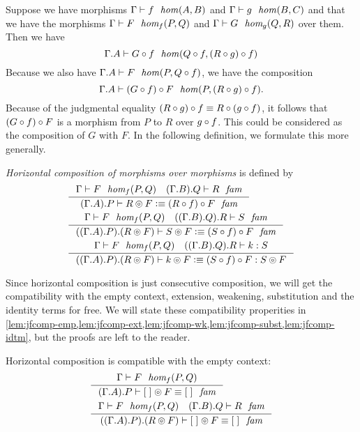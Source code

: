 Suppose we have morphisms $\jhom{\Gamma}{A}{B}{f}$ and $\jhom{\Gamma}{B}{C}{g}$
and that we have the morphisms $\jfhom{\Gamma}{A}{B}{f}{P}{Q}{F}$ and
$\jfhom{\Gamma}{B}{C}{g}{Q}{R}{G}$ over them. Then we have\begin{equation*}
\jhom
  {{\Gamma}{A}}
  {\jcomp{A}{f}{Q}}
  {\jcomp{A}{f}{{B}{g}{R}}}
  {\jcomp{A}{f}{G}}
\end{equation*}
Because we also have $\jhom{{\Gamma}{A}}{P}{\jcomp{A}{f}{Q}}{F}$, we have the
composition\begin{equation*}
\jhom
  {{\Gamma}{A}}
  {P}
  {\jcomp{A}{f}{{B}{g}{R}}}
  {\jcomp{P}{F}{\jcomp{A}{f}{G}}}.
\end{equation*}
Because of 
the judgmental equality $\jcomp{A}{f}{{B}{g}{R}}\jdeq
\jcomp{A}{{A}{f}{g}}{R}$, it follows that 
$\jcomp{P}{F}{\jcomp{A}{f}{G}}$ is a morphism from $P$ to $R$ over
$\jcomp{A}{f}{g}$. This could be considered as the composition of $G$ with $F$.
In the following definition, we formulate this more generally.

\begin{defn}
\emph{Horizontal composition of morphisms over morphisms} is defined by
\begin{align*}
& \inference
  { \jfhom{\Gamma}{A}{B}{f}{P}{Q}{F}
    \jfam{{{\Gamma}{B}}{Q}}{R}
    }
  { \jfamdefn
      {{{\Gamma}{A}}{P}}
      {\jfcomp{A}{f}{P}{F}{R}}
      {\unfold{\jfcomp{A}{f}{P}{F}{R}}}
    }
  \\
& \inference
  { \jfhom{\Gamma}{A}{B}{f}{P}{Q}{F}
    \jfam{{{{\Gamma}{B}}{Q}}{R}}{S}
    }
  { \jfamdefn
      {{{{\Gamma}{A}}{P}}{\jfcomp{A}{f}{P}{F}{R}}}
      {\jfcomp{A}{f}{P}{F}{S}}
      {\unfold{\jfcomp{A}{f}{P}{F}{S}}}
    }
  \\
& \inference
  { \jfhom{\Gamma}{A}{B}{f}{P}{Q}{F}
    \jterm{{{{\Gamma}{B}}{Q}}{R}}{S}{k}
    }
  { \jtermdefn
      {{{{\Gamma}{A}}{P}}{\jfcomp{A}{f}{P}{F}{R}}}
      {\jfcomp{A}{f}{P}{F}{S}}
      {\jfcomp{A}{f}{P}{F}{k}}
      {\unfold{\jfcomp{A}{f}{P}{F}{S}}}
    }
\end{align*}
\end{defn}

Since horizontal composition is just consecutive composition, we will get the
compatibility with the empty context, extension, weakening, substitution and
the identity terms for free. We will state these compatibility properities in
\autoref{lem:jfcomp-emp,lem:jfcomp-ext,lem:jfcomp-wk,lem:jfcomp-subst,lem:jfcomp-idtm},
but the proofs are left to the reader.

\begin{lem}\label{lem:jfcomp-emp}
Horizontal composition is compatible with the empty context:
\begin{align*}
& \inference
  { \jfhom{\Gamma}{A}{B}{f}{P}{Q}{F}
    }
  { \jfameq
      {{{\Gamma}{A}}{P}}
      {\jfcomp{A}{f}{P}{F}{\emptyf}}
      {\emptyf}
    }
  \\
& \inference
  { \jfhom{\Gamma}{A}{B}{f}{P}{Q}{F}
    \jfam{{{\Gamma}{B}}{Q}}{R}
    }
  { \jfameq
      {{{{\Gamma}{A}}{P}}{\jfcomp{A}{f}{P}{F}{R}}}
      {\jfcomp{A}{f}{P}{F}{\emptyf}}
      {\emptyf}
    }
\end{align*}
\end{lem}

